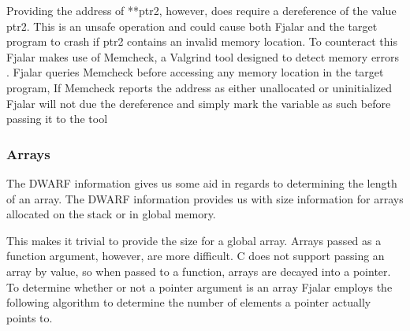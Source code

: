 \documentclass[11pt]{article}
\begin{document}
Providing the address of **ptr2, however, does require a dereference
of the value ptr2. This is an unsafe operation and could cause both
Fjalar and the target program to crash if ptr2 contains an
invalid memory location. To counteract this Fjalar makes use of
Memcheck, a Valgrind tool designed to detect memory errors 
\cite{nethercote-shadow}. Fjalar queries
Memcheck before accessing any memory location in the target
program, If Memcheck reports the address as either unallocated or
uninitialized Fjalar will not due the dereference and simply mark the
variable as such before passing it to the tool

\subsubsection{Arrays}
The DWARF information gives us some aid in regards to determining the
length of an array. The DWARF information provides us with
size information for arrays allocated on the stack or in global
memory.

This makes it trivial to provide the size for a global array. Arrays
passed as a function argument, however, are more difficult. C does not
support passing an array by value, so when passed to a function,
arrays are decayed into a pointer. To determine whether or not a
pointer argument is an array Fjalar employs the following algorithm to
determine the number of elements a pointer actually points to.
\end{document}
